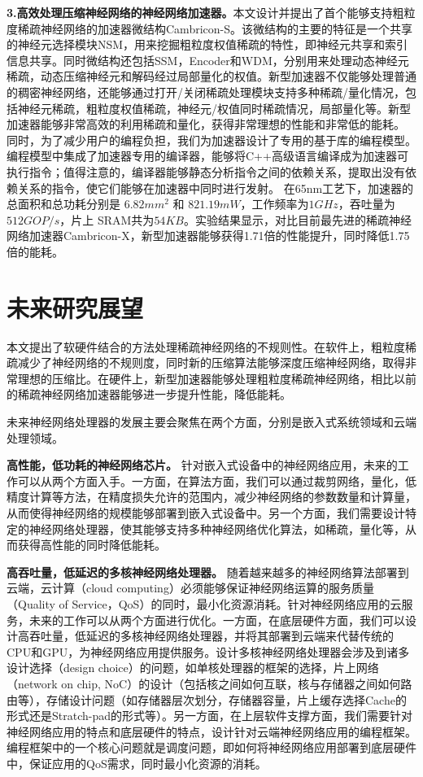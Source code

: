 \textbf{3.高效处理压缩神经网络的神经网络加速器。}本文设计并提出了首个能够支持粗粒度稀疏神经网络的加速器微结构Cambricon-S。该微结构的主要的特征是一个共享的神经元选择模块NSM，用来挖掘粗粒度权值稀疏的特性，即神经元共享和索引信息共享。同时微结构还包括SSM，Encoder和WDM，分别用来处理动态神经元稀疏，动态压缩神经元和解码经过局部量化的权值。新型加速器不仅能够处理普通的稠密神经网络，还能够通过打开/关闭稀疏处理模块支持多种稀疏/量化情况，包括神经元稀疏，粗粒度权值稀疏，神经元/权值同时稀疏情况，局部量化等。新型加速器能够非常高效的利用稀疏和量化，获得非常理想的性能和非常低的能耗。
同时，为了减少用户的编程负担，我们为加速器设计了专用的基于库的编程模型。编程模型中集成了加速器专用的编译器，能够将C++高级语言编译成为加速器可执行指令；值得注意的，编译器能够静态分析指令之间的依赖关系，提取出没有依赖关系的指令，使它们能够在加速器中同时进行发射。
在65nm工艺下，加速器的总面积和总功耗分别是 $6.82mm^2$ 和 $821.19mW$，工作频率为$1GHz$，吞吐量为$512GOP/s$，片上 SRAM共为$54KB$。实验结果显示，对比目前最先进的稀疏神经网络加速器Cambricon-X，新型加速器能够获得1.71倍的性能提升，同时降低1.75倍的能耗。

\section{未来研究展望}

本文提出了软硬件结合的方法处理稀疏神经网络的不规则性。在软件上，粗粒度稀疏减少了神经网络的不规则度，同时新的压缩算法能够深度压缩神经网络，取得非常理想的压缩比。在硬件上，新型加速器能够处理粗粒度稀疏神经网络，相比以前的稀疏神经网络加速器能够进一步提升性能，降低能耗。

未来神经网络处理器的发展主要会聚焦在两个方面，分别是嵌入式系统领域和云端处理领域。

\textbf{高性能，低功耗的神经网络芯片。}
针对嵌入式设备中的神经网络应用，未来的工作可以从两个方面入手。一方面，在算法方面，我们可以通过裁剪网络，量化，低精度计算等方法，在精度损失允许的范围内，减少神经网络的参数数量和计算量，从而使得神经网络的规模能够部署到嵌入式设备中。另一个方面，我们需要设计特定的神经网络处理器，使其能够支持多种神经网络优化算法，如稀疏，量化等，从而获得高性能的同时降低能耗。

\textbf{高吞吐量，低延迟的多核神经网络处理器。}
随着越来越多的神经网络算法部署到云端，云计算（cloud computing）必须能够保证神经网络运算的服务质量（Quality of Service，QoS）的同时，最小化资源消耗。针对神经网络应用的云服务，未来的工作可以从两个方面进行优化。一方面，在底层硬件方面，我们可以设计高吞吐量，低延迟的多核神经网络处理器，并将其部署到云端来代替传统的CPU和GPU，为神经网络应用提供服务。设计多核神经网络处理器会涉及到诸多设计选择（design choice）的问题，如单核处理器的框架的选择，片上网络（network on chip, NoC）的设计（包括核之间如何互联，核与存储器之间如何路由等），存储设计问题（如存储器层次划分，存储器容量，片上缓存选择Cache的形式还是Stratch-pad的形式等）。另一方面，在上层软件支撑方面，我们需要针对神经网络应用的特点和底层硬件的特点，设计针对云端神经网络应用的编程框架。编程框架中的一个核心问题就是调度问题，即如何将神经网络应用部署到底层硬件中，保证应用的QoS需求，同时最小化资源的消耗。



